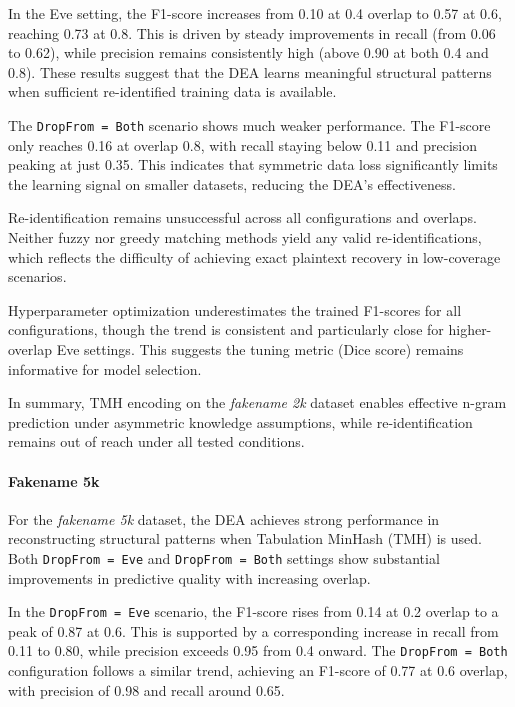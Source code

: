 In the Eve setting, the F1-score increases from 0.10 at 0.4 overlap to 0.57 at 0.6, reaching 0.73 at 0.8. This is driven by steady improvements in recall (from 0.06 to 0.62), while precision remains consistently high (above 0.90 at both 0.4 and 0.8). These results suggest that the DEA learns meaningful structural patterns when sufficient re-identified training data is available.

The \texttt{DropFrom = Both} scenario shows much weaker performance. The F1-score only reaches 0.16 at overlap 0.8, with recall staying below 0.11 and precision peaking at just 0.35. This indicates that symmetric data loss significantly limits the learning signal on smaller datasets, reducing the DEA’s effectiveness.

Re-identification remains unsuccessful across all configurations and overlaps. Neither fuzzy nor greedy matching methods yield any valid re-identifications, which reflects the difficulty of achieving exact plaintext recovery in low-coverage scenarios.

Hyperparameter optimization underestimates the trained F1-scores for all configurations, though the trend is consistent and particularly close for higher-overlap Eve settings. This suggests the tuning metric (Dice score) remains informative for model selection.

In summary, TMH encoding on the \textit{fakename 2k} dataset enables effective n-gram prediction under asymmetric knowledge assumptions, while re-identification remains out of reach under all tested conditions.


\paragraph{Fakename 5k}

For the \textit{fakename 5k} dataset, the DEA achieves strong performance in reconstructing structural patterns when Tabulation MinHash (TMH) is used. Both \texttt{DropFrom = Eve} and \texttt{DropFrom = Both} settings show substantial improvements in predictive quality with increasing overlap.

In the \texttt{DropFrom = Eve} scenario, the F1-score rises from 0.14 at 0.2 overlap to a peak of 0.87 at 0.6. This is supported by a corresponding increase in recall from 0.11 to 0.80, while precision exceeds 0.95 from 0.4 onward. The \texttt{DropFrom = Both} configuration follows a similar trend, achieving an F1-score of 0.77 at 0.6 overlap, with precision of 0.98 and recall around 0.65.

